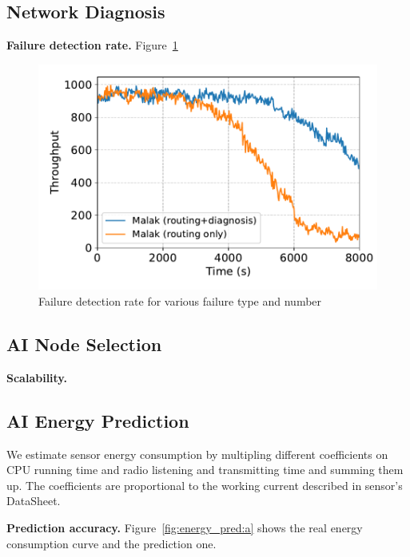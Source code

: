 \subsection{Network Diagnosis}
\textbf{Failure detection rate.}
Figure~\ref{fig:diagnosis}

\begin{figure}[htbp]
	\centering
	\includegraphics[width=.85\columnwidth]{Figure/diagnosis}
	\vspace{-0.1in}
	\caption{Failure detection rate for various failure type and number
		\textnormal{
		}}
	\label{fig:diagnosis}
\end{figure}

\subsection{AI Node Selection}
\textbf{Scalability.}

\subsection{AI Energy Prediction}

We estimate sensor energy consumption by multipling different coefficients on
CPU running time and radio listening and transmitting time and summing them up.
The coefficients are proportional to the working current described in sensor's
DataSheet.

\textbf{Prediction accuracy.}
Figure~\ref{fig:energy_pred:a} shows the real energy consumption curve and the
prediction one.


